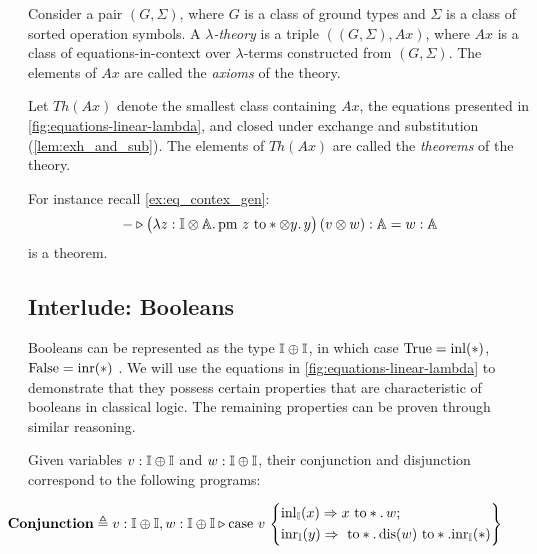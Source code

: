 


\begin{definition} \label{def:linear_lambda_theory}
  Consider a pair $(G, \Sigma)$, where $G$ is a class of ground types and $\Sigma$ is a class of sorted operation symbols. A \emph{$\lambda$-theory} is a triple $((G, \Sigma), Ax)$, where $Ax$ is a class of equations-in-context over $\lambda$-terms constructed from $(G, \Sigma)$. The elements of $Ax$ are called the \emph{axioms} of the theory.
\end{definition}


 Let $Th(Ax)$ denote the smallest class containing $Ax$, the equations presented in \autoref{fig:equations-linear-lambda}, and closed under exchange and substitution (\autoref{lem:exh_and_sub}). The elements of $Th(Ax)$ are called the \emph{theorems} of the theory.

 For instance recall \autoref{ex:eq_contex_gen}: 
 $$- \triangleright \big(\lambda z : \mathbb{I} \otimes \mathbb{A}. \, \text{pm } z \text{ to} * \otimes y. \, y\big) \, (v \otimes w): \mathbb{A} =  w : \mathbb{A} $$
 is a theorem.

\subsection{Interlude: Booleans} \label{subsec:interlude_bool}
Booleans can be represented as the type $\mathbb{I} \oplus \mathbb{I}$, in which case $\text{True} = \mathrm{inl}(*)$, $\text{False} = \mathrm{inr}(*)$ \cite{selinger2013lecture}. We will use the equations in \autoref{fig:equations-linear-lambda} to demonstrate that they possess certain properties that are characteristic of booleans in classical logic. The remaining properties can be proven through similar reasoning. 

Given variables $v : \mathbb{I} \oplus \mathbb{I}$ and $w : \mathbb{I} \oplus \mathbb{I}$, their conjunction and disjunction correspond to the following programs:

\begin{align*}
  & \hspace{-25pt}\textbf{Conjunction} \triangleq v:\typeI \oplus \typeI, w:\typeI \oplus \typeI \vljud \text{case } v\,
\left\{
    \begin{aligned} 
    &\inl_{\typeI}(x) \Rightarrow x \text{ to} *. \, w ; \\
    &\inr_{\typeI}(y) \Rightarrow   \text{ to} *. \,  \text{dis}(w) \text{ to} *. \inr_{\typeI}(*)  \\ 
  \end{aligned}  
  \right\}
\end{align*}

